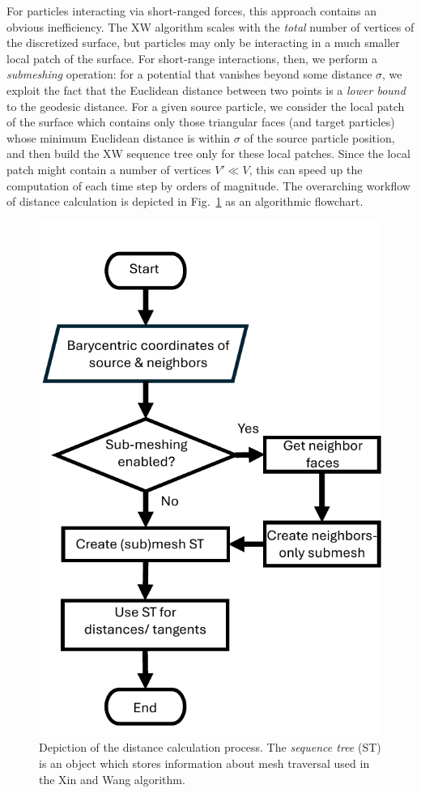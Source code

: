 \documentclass[preprint,12pt]{elsarticle}
\begin{document}
For particles interacting via short-ranged forces, this approach contains an obvious inefficiency. The XW algorithm scales with the \emph{total} number of vertices of the discretized surface, but particles may only be interacting in a much smaller local patch of the surface. For short-range interactions, then, we perform a \emph{submeshing} operation: for a potential that vanishes beyond some distance $\sigma$, we exploit the fact that the Euclidean distance between two points is a \emph{lower bound} to the geodesic distance. For a given source particle, we consider the local patch of the surface which contains only those triangular faces (and target particles) whose minimum Euclidean distance is within $\sigma$ of the source particle position, and then build the XW sequence tree only for these local patches. Since the local patch might contain a number of vertices $V' \ll V$, this can speed up the computation of each time step by orders of magnitude. The overarching workflow of distance calculation is depicted in Fig.~\ref{fig:force_flowchart} as an algorithmic flowchart.

\begin{figure}
    \centering
    \includegraphics[width=1.0\columnwidth]{force_flowchart_v4.pdf}
    \caption{Depiction of the distance calculation process. The \emph{sequence tree} (ST) is an object which stores information about mesh traversal used in the Xin and Wang algorithm.} 
    \label{fig:force_flowchart}
\end{figure}
\end{document}
